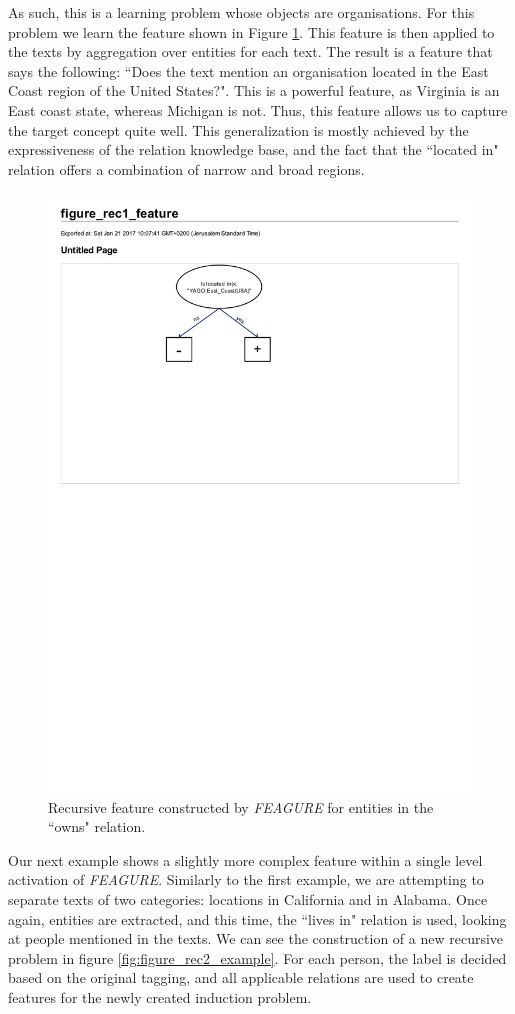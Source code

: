 \documentclass[twoside,11pt]{article}
\theoremstyle{definition}
\begin{document}
As such, this is a learning problem whose objects are organisations. For this problem we learn the feature shown in Figure \ref{fig:feature_eastcoast_rel}. This feature is then applied to the texts by aggregation over entities for each text.
The result is a feature that says the following: ``Does the text mention an organisation located in the East Coast region of the United States?".
This is a powerful feature, as Virginia is an East coast state, whereas Michigan is not. Thus, this feature allows us to capture the target concept quite well.
This generalization is mostly achieved by the expressiveness of the relation knowledge base, and the fact that the ``located in" relation offers a combination of narrow and broad regions.

\begin{figure}[!h]
	\centering
	\includegraphics[width=0.5\linewidth]{figure_rec1_feature.pdf}
	\caption{Recursive feature constructed by \emph{FEAGURE} for entities in the ``owns" relation.}
	\label{fig:feature_eastcoast_rel}
\end{figure}

Our next example shows a slightly more complex feature within a single level activation of \emph{FEAGURE}. Similarly to the first example, we are attempting to separate texts of two categories: locations in California and in Alabama. 
Once again, entities are extracted, and this time, the ``lives in" relation is used, looking at people mentioned in the texts.
We can see the construction of a new recursive problem in figure \ref{fig:figure_rec2_example}. For each person, the label is decided based on the original tagging, and all applicable relations are used to create features for the newly created induction problem.
\end{document}
